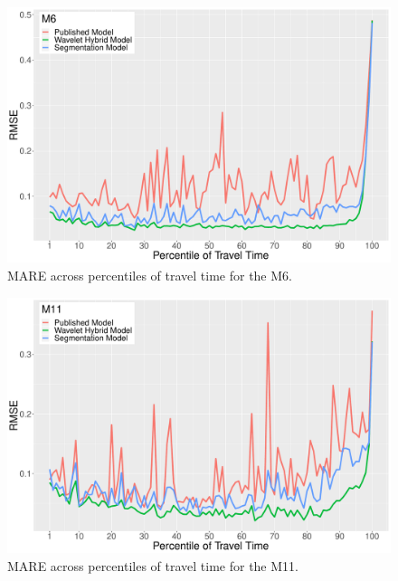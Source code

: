 \documentclass[letterpaper, 10 pt, conference]{ieeeconf}  %
\begin{document}
\begin{figure}[htbp]
	\centerline{\includegraphics[width=\linewidth]{./images/M6_quantile_1_rms_8_12.pdf}}
	\caption{MARE across percentiles of travel time for the M6.}
	\label{fig:m6q}
\end{figure}
\begin{figure}[htbp]
	\centerline{\includegraphics[width=\linewidth]{./images/M11_quantile_1_rms_8_12.pdf}}
	\caption{MARE across percentiles of travel time for the M11.}
	\label{fig:m11q}
\end{figure}
\end{document}
